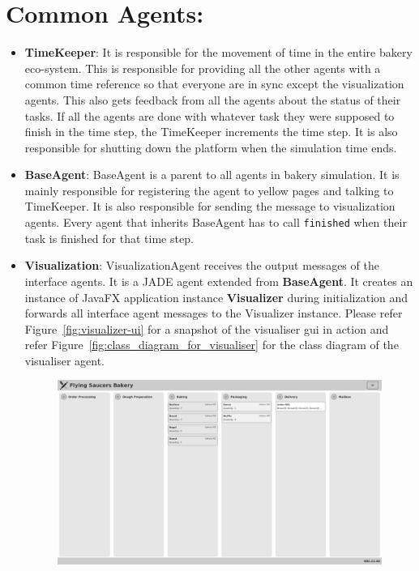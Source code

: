 \documentclass[12pt]{article}
\begin{document}
\section{Common Agents:}
\begin{itemize}
    \item \textbf{TimeKeeper}: 
 It is responsible for the movement of time in the entire bakery eco-system.
 This is responsible for providing all the other agents with a common time reference so that everyone are in sync except the visualization agents.
 This also gets feedback from all the agents about the status of their tasks.
 If all the agents are done with whatever task they were supposed to finish in the time step, the TimeKeeper increments the time step. 
 It is also responsible for shutting down the platform when the simulation time ends.
\item \textbf{BaseAgent}:
BaseAgent is a parent to all agents in bakery simulation.
It is mainly responsible for registering the agent to yellow pages and talking to TimeKeeper.
It is also responsible for sending the message to visualization agents.
Every agent that inherits BaseAgent has to call \texttt{finished} when their task is finished for that time step.
\item \textbf{Visualization}:
VisualizationAgent receives the output messages of the interface agents. It is a JADE agent extended from \textbf{BaseAgent}. It creates an instance of JavaFX application instance \textbf{Visualizer} during initialization and forwards all interface agent messages to the Visualizer instance.
Please refer Figure~\ref{fig:visualizer-ui} for a snapshot of the visualiser gui in action and refer 
Figure~\ref{fig:class_diagram_for_visualiser} for the class diagram of the visualiser agent.
\begin{figure}[H]
	\centering
	\includegraphics[width=1.0\linewidth]{visualizer-ui.png}

\end{figure}
\end{itemize}
\end{document}
